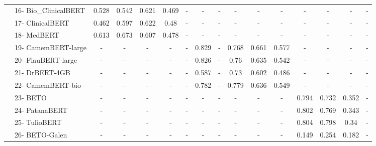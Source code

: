 {\begin{tabular}{ll|ccccc|ccccc|cccc}
 & 16- Bio\_ClinicalBERT & 0.528 & 0.542 & 0.621 & 0.469 & - & - & - & - & - & - & - & - & - & - \\
 & 17- ClinicalBERT & 0.462 & 0.597 & 0.622 & 0.48 & - & - & - & - & - & - & - & - & - & - \\
 & 18- MedBERT & 0.613 & 0.673 & 0.607 & 0.478 & - & - & - & - & - & - & - & - & - & - \\
 & 19- CamemBERT-large & - & - & - & - & - & 0.829 & - & 0.768 & 0.661 & 0.577 & - & - & - & - \\
 & 20- FlauBERT-large & - & - & - & - & - & 0.826 & - & 0.76 & 0.635 & 0.542 & - & - & - & - \\
 & 21- DrBERT-4GB & - & - & - & - & - & 0.587 & - & 0.73 & 0.602 & 0.486 & - & - & - & - \\
 & 22- CamemBERT-bio & - & - & - & - & - & 0.782 & - & 0.779 & 0.636 & 0.549 & - & - & - & - \\
 & 23- BETO & - & - & - & - & - & - & - & - & - & - & 0.794 & 0.732 & 0.352 & - \\
 & 24- PatanaBERT & - & - & - & - & - & - & - & - & - & - & 0.802 & 0.769 & 0.343 & - \\
 & 25- TulioBERT & - & - & - & - & - & - & - & - & - & - & 0.804 & 0.798 & 0.34 & - \\
 & 26- BETO-Galen & - & - & - & - & - & - & - & - & - & - & 0.149 & 0.254 & 0.182 & - \\
\bottomrule
\end{tabular}}